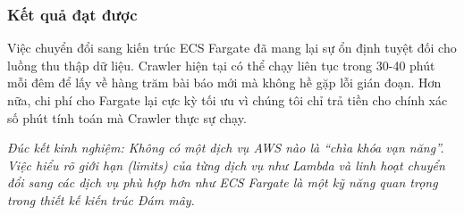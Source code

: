 \hypertarget{kux1ebft-quux1ea3-ux111ux1ea1t-ux111ux1b0ux1ee3c}{%
\subsubsection{Kết quả đạt
được}}

Việc chuyển đổi sang kiến trúc ECS Fargate đã mang lại sự ổn định tuyệt
đối cho luồng thu thập dữ liệu. Crawler hiện tại có thể chạy liên tục
trong 30-40 phút mỗi đêm để lấy về hàng trăm bài báo mới mà không hề gặp
lỗi gián đoạn. Hơn nữa, chi phí cho Fargate lại cực kỳ tối ưu vì chúng
tôi chỉ trả tiền cho chính xác số phút tính toán mà Crawler thực sự
chạy.

\emph{Đúc kết kinh nghiệm: Không có một dịch vụ AWS nào là ``chìa khóa
vạn năng''. Việc hiểu rõ giới hạn (limits) của từng dịch vụ như Lambda
và linh hoạt chuyển đổi sang các dịch vụ phù hợp hơn như ECS Fargate là
một kỹ năng quan trọng trong thiết kế kiến trúc Đám mây.}
